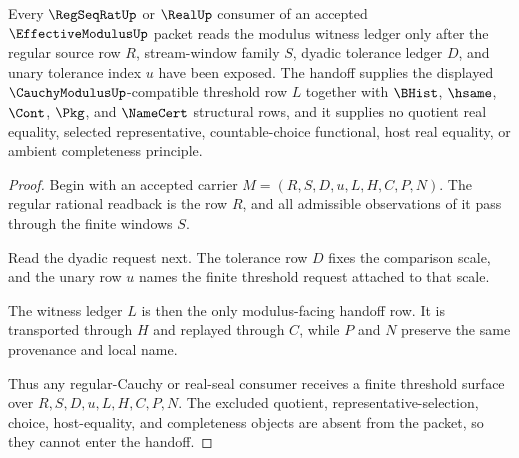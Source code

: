 \begin{theorem}
\label{thm:effective-modulus-regular-cauchy-handoff}
Every $\RegSeqRatUp$ or $\RealUp$ consumer of an accepted $\EffectiveModulusUp$ packet reads the modulus witness ledger only after the regular source row $R$, stream-window family $S$, dyadic tolerance ledger $D$, and unary tolerance index $u$ have been exposed. The handoff supplies the displayed $\CauchyModulusUp$-compatible threshold row $L$ together with $\BHist$, $\hsame$, $\Cont$, $\Pkg$, and $\NameCert$ structural rows, and it supplies no quotient real equality, selected representative, countable-choice functional, host real equality, or ambient completeness principle.
\end{theorem}
\begin{proof}
Begin with an accepted carrier $M=(R,S,D,u,L,H,C,P,N)$. The regular rational readback is the row $R$, and all admissible observations of it pass through the finite windows $S$.

Read the dyadic request next. The tolerance row $D$ fixes the comparison scale, and the unary row $u$ names the finite threshold request attached to that scale.

The witness ledger $L$ is then the only modulus-facing handoff row. It is transported through $H$ and replayed through $C$, while $P$ and $N$ preserve the same provenance and local name.

Thus any regular-Cauchy or real-seal consumer receives a finite threshold surface over $R,S,D,u,L,H,C,P,N$. The excluded quotient, representative-selection, choice, host-equality, and completeness objects are absent from the packet, so they cannot enter the handoff.
\end{proof}


\begin{closurestatus}{\EffectiveModulusUp}
  \theoryclosure{\seedClosure}
  \formalstatus{\unformalizedV}
\end{closurestatus}
